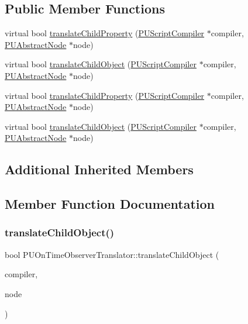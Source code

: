 \subsection*{Public Member Functions}
\begin{DoxyCompactItemize}
\item 
virtual bool \hyperlink{classPUOnTimeObserverTranslator_aa509cad026a33279d1d3ec0ab319b14e}{translate\+Child\+Property} (\hyperlink{classPUScriptCompiler}{P\+U\+Script\+Compiler} $\ast$compiler, \hyperlink{classPUAbstractNode}{P\+U\+Abstract\+Node} $\ast$node)
\item 
virtual bool \hyperlink{classPUOnTimeObserverTranslator_a329afb6be1b95487ce222a11272283e8}{translate\+Child\+Object} (\hyperlink{classPUScriptCompiler}{P\+U\+Script\+Compiler} $\ast$compiler, \hyperlink{classPUAbstractNode}{P\+U\+Abstract\+Node} $\ast$node)
\item 
virtual bool \hyperlink{classPUOnTimeObserverTranslator_a0351110957616a2658cfc2215c626e9d}{translate\+Child\+Property} (\hyperlink{classPUScriptCompiler}{P\+U\+Script\+Compiler} $\ast$compiler, \hyperlink{classPUAbstractNode}{P\+U\+Abstract\+Node} $\ast$node)
\item 
virtual bool \hyperlink{classPUOnTimeObserverTranslator_a7f6f184ecdd74fd0f11780aef6ddba90}{translate\+Child\+Object} (\hyperlink{classPUScriptCompiler}{P\+U\+Script\+Compiler} $\ast$compiler, \hyperlink{classPUAbstractNode}{P\+U\+Abstract\+Node} $\ast$node)
\end{DoxyCompactItemize}
\subsection*{Additional Inherited Members}


\subsection{Member Function Documentation}
\mbox{\label{classPUOnTimeObserverTranslator_a329afb6be1b95487ce222a11272283e8}} 
\subsubsection{\texorpdfstring{translate\+Child\+Object()}{translateChildObject()}\hspace{0.1cm}{\footnotesize\ttfamily [1/2]}}
{\footnotesize\ttfamily bool P\+U\+On\+Time\+Observer\+Translator\+::translate\+Child\+Object (\begin{DoxyParamCaption}\item[{\hyperlink{classPUScriptCompiler}{P\+U\+Script\+Compiler} $\ast$}]{compiler,  }\item[{\hyperlink{classPUAbstractNode}{P\+U\+Abstract\+Node} $\ast$}]{node }\end{DoxyParamCaption})\hspace{0.3cm}{\ttfamily [virtual]}}

